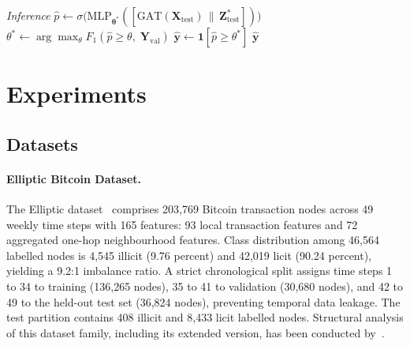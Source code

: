 \documentclass[12pt,a4paper]{article}
\begin{document}
\begin{algorithm}[htbp]
\begin{algorithmic}[1]
\vspace{2pt}
\Statex \textit{Inference}
\State $\hat{p} \leftarrow
  \sigma\!\bigl(\text{MLP}_{\boldsymbol{\theta}^*}(
    [\text{GAT}(\mathbf{X}_\text{test})\,\|\,
     \mathbf{Z}^*_\text{test}])\bigr)$
\State $\theta^* \leftarrow \arg\max_\theta
  F_1(\hat{p} \geq \theta,\;\mathbf{Y}_\text{val})$
\State $\hat{\mathbf{y}} \leftarrow
  \mathbf{1}[\hat{p} \geq \theta^*]$
\State \Return $\hat{\mathbf{y}}$
\end{algorithmic}
\end{algorithm}

\section{Experiments}
\label{sec:exp}

\subsection{Datasets}
\label{sec:data}

\paragraph{Elliptic Bitcoin Dataset.}
The Elliptic dataset~\citep{weber2019} comprises 203,769
Bitcoin transaction nodes across 49 weekly time steps with
165 features: 93 local transaction features and 72
aggregated one-hop neighbourhood features. Class
distribution among 46,564 labelled nodes is 4,545 illicit
(9.76 percent) and 42,019 licit (90.24 percent), yielding
a 9.2:1 imbalance ratio. A strict chronological split
assigns time steps 1 to 34 to training (136,265 nodes),
35 to 41 to validation (30,680 nodes), and 42 to 49 to
the held-out test set (36,824 nodes), preventing temporal
data leakage. The test partition contains 408 illicit
and 8,433 licit labelled nodes. Structural analysis of this
dataset family, including its extended version, has been
conducted by~\citet{bellei2024}.
\end{document}
